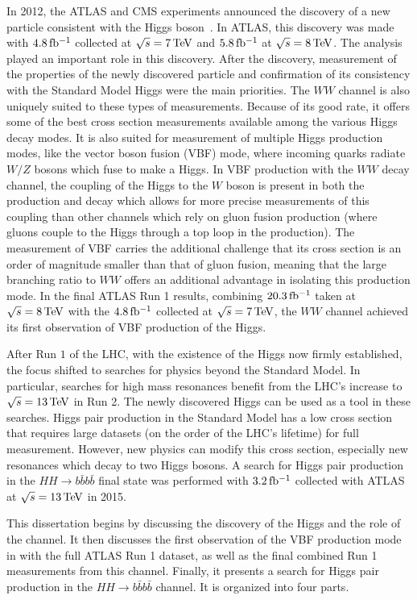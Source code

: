 In 2012, the ATLAS and CMS experiments announced the discovery of a new particle consistent with the Higgs boson~\cite{Discovery,CMSDiscovery}. In ATLAS, this discovery was made with $4.8 \mbox{\,fb$^{-1}$}$ collected at $\sqrt{s} = 7 \TeV$ and $5.8 \mbox{\,fb$^{-1}$}$ at $\sqrt{s} = 8 \TeV$. The \HWWfull analysis played an important role in this discovery. After the discovery, measurement of the properties of the newly discovered particle and confirmation of its consistency with the Standard Model Higgs were the main priorities. The $WW$ channel is also uniquely suited to these types of measurements. Because of its good rate, it offers some of the best cross section measurements available among the various Higgs decay modes. It is also suited for measurement of multiple Higgs production modes, like the vector boson fusion (VBF) mode, where incoming quarks radiate $W/Z$ bosons which fuse to make a Higgs. In VBF production with the $WW$ decay channel, the coupling of the Higgs to the $W$ boson is present in both the production and decay which allows for more precise measurements of this coupling than other channels which rely on gluon fusion production (where gluons couple to the Higgs through a top loop in the production). The measurement of VBF carries the additional challenge that its cross section is an order of magnitude smaller than that of gluon fusion, meaning that the large branching ratio to $WW$ offers an additional advantage in isolating this production mode. In the final ATLAS Run 1 results, combining $20.3 \mbox{\,fb$^{-1}$}$ taken at $\sqrt{s} = 8 \TeV$ with the $4.8 \mbox{\,fb$^{-1}$}$ collected at $\sqrt{s} = 7 \TeV$, the $WW$ channel achieved its first observation of VBF production of the Higgs.

After Run $1$ of the LHC, with the existence of the Higgs now firmly established, the focus shifted to searches for physics beyond the Standard Model. In particular, searches for high mass resonances benefit from the LHC's increase to $\sqrt{s} = 13 \TeV$ in Run 2. The newly discovered Higgs can be used as a tool in these searches. Higgs pair production in the Standard Model has a low cross section that requires large datasets (on the order of the LHC's lifetime) for full measurement. However, new physics can modify this cross section, especially new resonances which decay to two Higgs bosons. A search for Higgs pair production in the $HH\to b\bar{b}b\bar{b}$ final state was performed with $3.2 \mbox{\,fb$^{-1}$}$ collected with ATLAS at $\sqrt{s} = 13 \TeV$ in 2015. 

This dissertation begins by discussing the discovery of the Higgs and the role of the \HWWfull channel. It then discusses the first observation of the VBF production mode in \HWWfull with the full ATLAS Run 1 dataset, as well as the final combined Run 1 measurements from this channel. Finally, it presents a search for Higgs pair production in the $HH\to b\bar{b}b\bar{b}$ channel. It is organized into four parts. 


